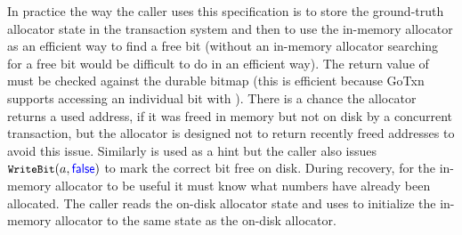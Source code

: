 In practice the way the caller uses this specification is to store the
ground-truth allocator state in the transaction system and then to use the
in-memory allocator as an efficient way to find a free bit (without an in-memory
allocator searching for a free bit would be difficult to do in an efficient
way). The return value of  must be checked against the durable bitmap
(this is efficient because GoTxn supports accessing an individual bit with
). There is a chance the allocator returns a used address, if it was
freed in memory but not on disk by a concurrent transaction, but the allocator
is designed not to return recently freed addresses to avoid this issue.
Similarly  is used as a hint but the caller also issues
$\cc{WriteBit}(a, \goosefalse)$ to mark the correct bit free on disk. During
recovery, for the in-memory allocator to be useful it must know what numbers
have already been allocated. The caller reads the on-disk allocator state and
uses  to initialize the in-memory allocator to the same state as
the on-disk allocator.

